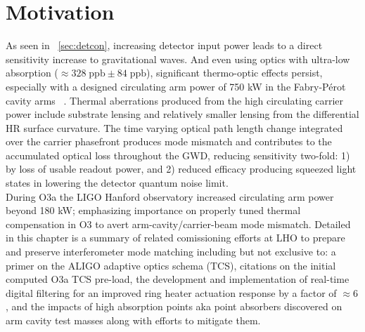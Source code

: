 




\section{Motivation}
As seen in ~\autoref{sec:detcon}, increasing detector input power leads to a direct sensitivity increase to gravitational waves. And even using optics with ultra-low absorption ($\approx 328 \; \mathrm{ppb} \pm 84 \; \mathrm{ppb}$), significant thermo-optic effects persist, especially with a designed circulating arm power of 750 kW in the Fabry-P\'{e}rot cavity arms ~\cite{tvo, aligo:2015}. Thermal aberrations produced from the high circulating carrier power include substrate lensing and relatively smaller lensing from the differential HR surface curvature. The time varying optical path length change integrated over the carrier phasefront produces mode mismatch and contributes to the accumulated optical loss throughout the GWD, reducing sensitivity two-fold: 1) by loss of usable readout power, and 2) reduced efficacy producing squeezed light states in lowering the detector quantum noise limit.
\\
During O3a the LIGO Hanford observatory increased circulating arm power beyond 180 kW; emphasizing importance on properly tuned thermal compensation in O3 to avert arm-cavity/carrier-beam mode mismatch. Detailed in this chapter is a summary of related comissioning efforts at LHO to prepare and preserve interferometer mode matching including but not exclusive to: a primer on the ALIGO adaptive optics schema (TCS), citations on the initial computed O3a TCS pre-load, the development and implementation of real-time digital filtering for an improved ring heater actuation response by a factor of $\approx 6$, and the impacts of high absorption points aka point absorbers discovered on arm cavity test masses along with efforts to mitigate them.

